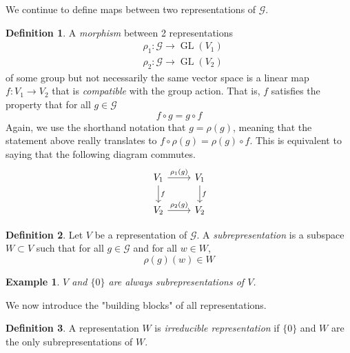 \documentclass{article}
\DeclareMathOperator{\GL}{GL}
\newtheorem{example}{Example}[section]
\theoremstyle{remark}
\theoremstyle{definition}
\newtheorem{definition}{Definition}[section]
\begin{document}
We continue to define maps between two representations of $\mathcal{G}$. 

\begin{definition}
A \textit{morphism} between 2 representations 
\begin{align*}
    & \rho_1: \mathcal{G} \longrightarrow \GL(V_1) \\
    & \rho_2: \mathcal{G} \longrightarrow \GL(V_2) 
\end{align*}
of some group but not necessarily the same vector space is a linear map $f: V_1 \longrightarrow V_2$ that is \textit{compatible} with the group action. That is, $f$ satisfies the property that for all $g \in \mathcal{G}$
\[f \circ g = g \circ f\]
Again, we use the shorthand notation that $g = \rho(g)$, meaning that the statement above really translates to $ f \circ \rho(g) = \rho(g) \circ f$. This is equivalent to saying that the following diagram commutes. 
\[\begin{tikzcd}
V_1 \arrow{r}{\rho_1(g)} \arrow{d}{f} & V_1 \arrow{d}{f} \\
V_2 \arrow{r}{\rho_2 (g)} & V_2
\end{tikzcd}\]
\end{definition}

\begin{definition}
Let $V$ be a representation of $\mathcal{G}$. A \textit{subrepresentation} is a subspace $W \subset V$ such that for all $g \in \mathcal{G}$ and for all $w \in W$, 
\[\rho(g)(w) \in W\]
\end{definition}

\begin{example}
$V$ and $\{0\}$ are always subrepresentations of $V$. 
\end{example}

We now introduce the "building blocks" of all representations. 
\begin{definition}
A representation $W$ is \textit{irreducible representation} if $\{0\}$ and $W$ are the only subrepresentations of $W$. 
\end{definition}
\end{document}
